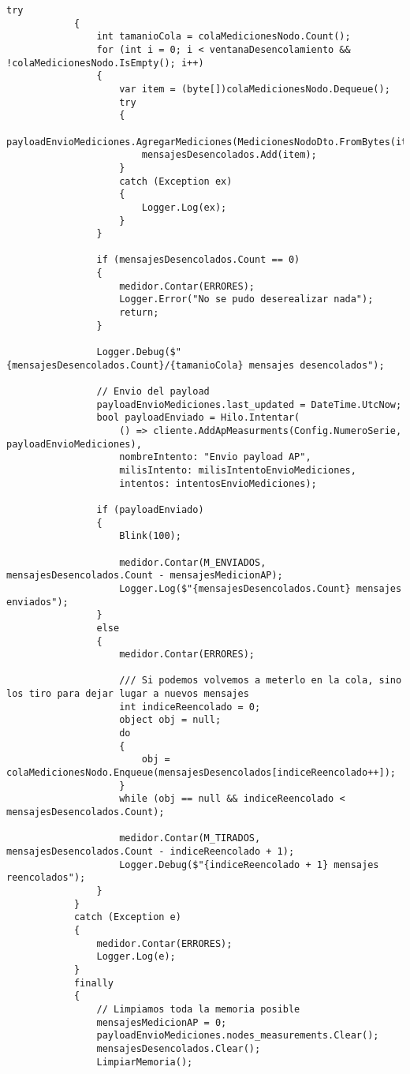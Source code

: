\begin{lstlisting}[caption={Ejemplo de código en C\#}]
            try
            {
                int tamanioCola = colaMedicionesNodo.Count();
                for (int i = 0; i < ventanaDesencolamiento && !colaMedicionesNodo.IsEmpty(); i++)
                {
                    var item = (byte[])colaMedicionesNodo.Dequeue();
                    try
                    {
                        payloadEnvioMediciones.AgregarMediciones(MedicionesNodoDto.FromBytes(item));
                        mensajesDesencolados.Add(item);
                    }
                    catch (Exception ex)
                    {
                        Logger.Log(ex);
                    }
                }

                if (mensajesDesencolados.Count == 0)
                {
                    medidor.Contar(ERRORES);
                    Logger.Error("No se pudo deserealizar nada");
                    return;
                }

                Logger.Debug($"{mensajesDesencolados.Count}/{tamanioCola} mensajes desencolados");

                // Envio del payload
                payloadEnvioMediciones.last_updated = DateTime.UtcNow;
                bool payloadEnviado = Hilo.Intentar(
                    () => cliente.AddApMeasurments(Config.NumeroSerie, payloadEnvioMediciones),
                    nombreIntento: "Envio payload AP",
                    milisIntento: milisIntentoEnvioMediciones,
                    intentos: intentosEnvioMediciones);

                if (payloadEnviado)
                {
                    Blink(100);

                    medidor.Contar(M_ENVIADOS, mensajesDesencolados.Count - mensajesMedicionAP);
                    Logger.Log($"{mensajesDesencolados.Count} mensajes enviados");
                }
                else
                {
                    medidor.Contar(ERRORES);

                    /// Si podemos volvemos a meterlo en la cola, sino los tiro para dejar lugar a nuevos mensajes
                    int indiceReencolado = 0;
                    object obj = null;
                    do
                    {
                        obj = colaMedicionesNodo.Enqueue(mensajesDesencolados[indiceReencolado++]);
                    }
                    while (obj == null && indiceReencolado < mensajesDesencolados.Count);

                    medidor.Contar(M_TIRADOS, mensajesDesencolados.Count - indiceReencolado + 1);
                    Logger.Debug($"{indiceReencolado + 1} mensajes reencolados");
                }
            }
            catch (Exception e)
            {
                medidor.Contar(ERRORES);
                Logger.Log(e);
            }
            finally
            {
                // Limpiamos toda la memoria posible
                mensajesMedicionAP = 0;
                payloadEnvioMediciones.nodes_measurements.Clear();
                mensajesDesencolados.Clear();
                LimpiarMemoria();


\end{lstlisting}
